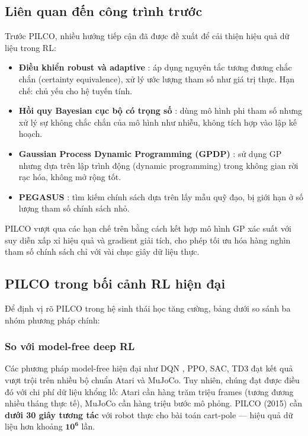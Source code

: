 \subsection{Liên quan đến công trình trước}
\label{SUB_SEC_related_work}

Trước PILCO, nhiều hướng tiếp cận đã được đề xuất để cải thiện hiệu quả dữ liệu trong RL:
\begin{itemize}
    \item \textbf{Điều khiển robust và adaptive} \cite{Astrom_Wittenmark_2008}: áp dụng nguyên tắc tương đương chắc chắn (certainty equivalence), xử lý ước lượng tham số như giá trị thực. Hạn chế: chủ yếu cho hệ tuyến tính.
    \item \textbf{Hồi quy Bayesian cục bộ có trọng số} \cite{Bagnell_Schneider_2001,Schneider_1997}: dùng mô hình phi tham số nhưng xử lý sự không chắc chắn của mô hình như nhiễu, không tích hợp vào lập kế hoạch.
    \item \textbf{Gaussian Process Dynamic Programming (GPDP)} \cite{Deisenroth_2009}: sử dụng GP nhưng dựa trên lập trình động (dynamic programming) trong không gian rời rạc hóa, không mở rộng tốt.
    \item \textbf{PEGASUS} \cite{Ng_Jordan_2000}: tìm kiếm chính sách dựa trên lấy mẫu quỹ đạo, bị giới hạn ở số lượng tham số chính sách nhỏ.
\end{itemize}
\medskip

PILCO vượt qua các hạn chế trên bằng cách kết hợp mô hình GP xác suất với suy diễn xấp xỉ hiệu quả và gradient giải tích, cho phép tối ưu hóa hàng nghìn tham số chính sách chỉ với vài chục giây dữ liệu thực.

\subsection{PILCO trong bối cảnh RL hiện đại}
\label{SUB_SEC_pilco_modern_context}

Để định vị rõ PILCO trong hệ sinh thái học tăng cường, bảng dưới so sánh ba nhóm phương pháp chính:

\subsubsection{So với model-free deep RL}
\label{SUB_SUB_SEC_vs_model_free}

Các phương pháp model-free hiện đại như DQN \cite{Watkins_1989}, PPO, SAC, TD3 đạt kết quả vượt trội trên nhiều bộ chuẩn Atari và MuJoCo. Tuy nhiên, chúng đạt được điều đó với chi phí dữ liệu khổng lồ: Atari cần hàng trăm triệu frames (tương đương nhiều tháng thực tế), MuJoCo cần hàng triệu bước mô phỏng. PILCO (2015) cần \textbf{dưới 30 giây tương tác} với robot thực cho bài toán cart-pole --- hiệu quả dữ liệu hơn khoảng $\mathbf{10^6}$ lần.

